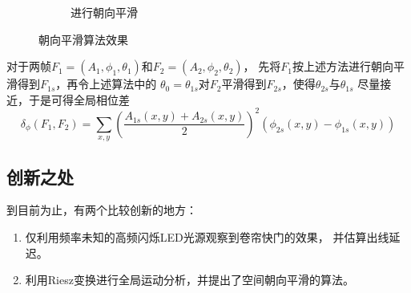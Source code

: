 \begin{figure}[tb]
\begin{center}
\begin{subfigure}[b]{.5\figwidth}
        \caption{进行朝向平滑}
    \end{subfigure}
    \caption{朝向平滑算法效果\label{fig:smooth}}
\end{center}\end{figure}

对于两帧$F_1 = (A_1, \phi_1, \theta_1)$和$F_2 = (A_2, \phi_2, \theta_2)$，
先将$F_1$按上述方法进行朝向平滑得到$F_{1s}$，再令上述算法中的
$\theta_0=\theta_{1s}$对$F_2$平滑得到$F_{2s}$，使得$\theta_{2s}$与$\theta_{1s}$
尽量接近，于是可得全局相位差
\begin{equation}
    \delta_\phi(F_1, F_2) = \sum_{x, y}
    \left(\frac{A_{1s}(x, y) + A_{2s}(x, y)}{2}\right)^2(\phi_{2s}(x, y) -
    \phi_{1s}(x, y))
\end{equation}


\subsection{创新之处}
到目前为止，有两个比较创新的地方：
\begin{enumerate}
    \item 仅利用频率未知的高频闪烁LED光源观察到卷帘快门的效果，
        并估算出线延迟。
    \item 利用Riesz变换进行全局运动分析，并提出了空间朝向平滑的算法。
\end{enumerate}


